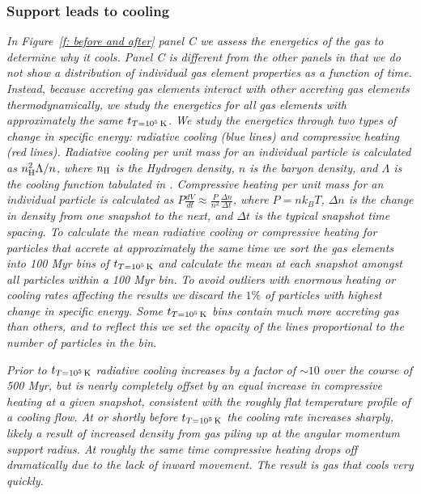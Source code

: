 \documentclass[fleqn,usenatbib]{mnras}
\newcommand{\tcon}{t_{T=10^5\,{\rm K}}}
\newcommand{\nH}{n_{\rm H}}
\begin{document}
\subsubsection{Support leads to cooling}

\textit{
In Figure~\ref{f: before and after} panel C we assess the energetics of the gas to determine why it cools.
Panel C is different from the other panels in that we do not show a distribution of individual gas element properties as a function of time.
Instead, because accreting gas elements interact with other accreting gas elements thermodynamically, we study the energetics for all gas elements with approximately the same $\tcon$.
We study the energetics through two types of change in specific energy: radiative cooling (blue lines) and compressive heating (red lines).
Radiative cooling per unit mass for an individual particle is calculated as $\nH^2 \Lambda / n$, where $\nH$ is the Hydrogen density, $n$ is the baryon density, and $\Lambda$ is the cooling function tabulated in \cite{Wiersma2009a}.
Compressive heating per unit mass for an individual particle is calculated as $P \frac{dV}{dt} \approx \frac{ P }{ n^2 } \frac{ \Delta n }{ \Delta t }$, where $P = n k_B T$, $\Delta n$ is the change in density from one snapshot to the next, and $\Delta t$ is the typical snapshot time spacing.
To calculate the mean radiative cooling or compressive heating for particles that accrete at approximately the same time we sort the gas elements into 100 Myr bins of $\tcon$ and calculate the mean at each snapshot amongst all particles within a 100 Myr bin.
To avoid outliers with enormous heating or cooling rates affecting the results we discard the $1\%$ of particles with highest change in specific energy.
Some $\tcon$ bins contain much more accreting gas than others, and to reflect this we set the opacity of the lines proportional to the number of particles in the bin.
}

\textit{
Prior to $\tcon$ radiative cooling increases by a factor of $\sim 10$ over the course of 500 Myr, but is nearly completely offset by an equal increase in compressive heating at a given snapshot, consistent with the roughly flat temperature profile of a cooling flow.
At or shortly before $\tcon$ the cooling rate increases sharply, likely a result of increased density from gas piling up at the angular momentum support radius.
At roughly the same time compressive heating drops off dramatically due to the lack of inward movement.
The result is gas that cools very quickly.
}
\end{document}
